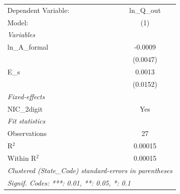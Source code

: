 
\begingroup
\centering
\begin{tabular}{lc}
   \tabularnewline \midrule \midrule
   Dependent Variable: & ln\_Q\_out\\    
   Model:              & (1)\\  
   \midrule
   \emph{Variables}\\
   ln\_A\_formal       & -0.0009\\   
                       & (0.0047)\\   
   E\_s                & 0.0013\\   
                       & (0.0152)\\   
   \midrule
   \emph{Fixed-effects}\\
   NIC\_2digit         & Yes\\  
   \midrule
   \emph{Fit statistics}\\
   Observations        & 27\\  
   R$^2$               & 0.00015\\  
   Within R$^2$        & 0.00015\\  
   \midrule \midrule
   \multicolumn{2}{l}{\emph{Clustered (State\_Code) standard-errors in parentheses}}\\
   \multicolumn{2}{l}{\emph{Signif. Codes: ***: 0.01, **: 0.05, *: 0.1}}\\
\end{tabular}
\par\endgroup


